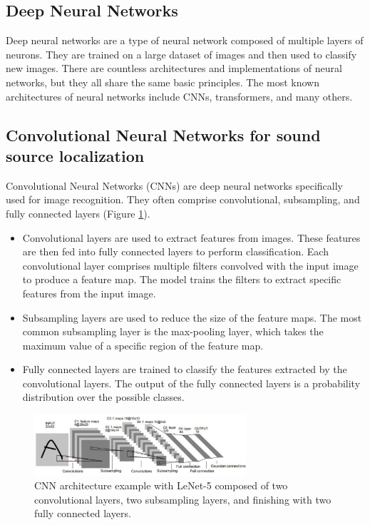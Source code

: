 \subsection{Deep Neural Networks}

Deep neural networks are a type of neural network composed of multiple layers of neurons\cite{Schmidhuber_2015}. They are trained on a large dataset of images and then used to classify new images. There are countless architectures \cite{LIU201711} and implementations of neural networks, but they all share the same basic principles. The most known architectures of neural networks include CNNs\cite{oshea2015introduction}, transformers\cite{vaswani2017attention}, and many others.

\subsection{Convolutional Neural Networks for sound source localization}
\label{sec:cnn_for_ssl}

Convolutional Neural Networks (CNNs)\cite{oshea2015introduction} are deep neural networks specifically used for image recognition. They often comprise convolutional, subsampling, and fully connected layers (Figure \ref*{fig:cnn_example}).
\begin{itemize}
    \item{} Convolutional layers are used to extract features from images. These features are then fed into fully connected layers to perform classification. Each convolutional layer comprises multiple filters convolved with the input image to produce a feature map. The model trains the filters to extract specific features from the input image.
    \item{} Subsampling layers are used to reduce the size of the feature maps. The most common subsampling layer is the max-pooling layer, which takes the maximum value of a specific region of the feature map.
    \item{} Fully connected layers are trained to classify the features extracted by the convolutional layers. The output of the fully connected layers is a probability distribution over the possible classes. 
\end{itemize}

\begin{figure}[H]
    \centering
    \includegraphics[width=0.7\textwidth]{../Images/cnn_example.png}
    \caption{CNN architecture example with LeNet-5 \protect\cite{726791} composed of two convolutional layers, two subsampling layers, and finishing with two fully connected layers.}
    \label{fig:cnn_example}
\end{figure}

